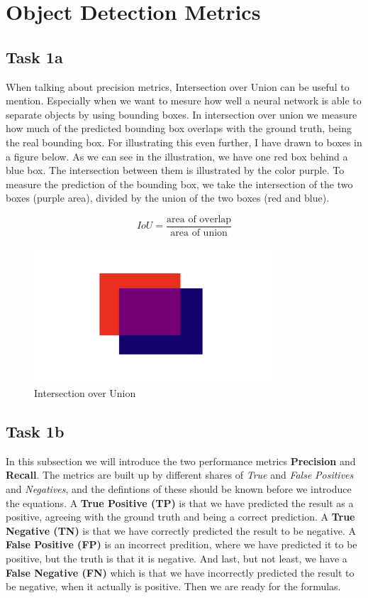 \section{Object Detection Metrics}
\subsection*{Task 1a}
When talking about precision metrics, Intersection over Union can be useful to mention.
Especially when we want to mesure how well a neural network is able to separate objects by using bounding boxes.
In intersection over union we measure how much of the predicted bounding box overlaps with the ground truth, being the real bounding box.
For illustrating this even further, I have drawn to boxes in a figure below. 
As we can see in the illustration, we have one red box behind a blue box. 
The intersection between them is illustrated by the color purple. 
To measure the prediction of the bounding box, we take the intersection of the two boxes (purple area), divided by the union of the two boxes (red and blue).

\begin{equation*}
    IoU = \frac{\text{area of overlap}}{\text{area of union}}
\end{equation*}

\begin{figure}[h!]
    \centering
    \includegraphics[width=0.8\textwidth]{Images/task1a.png}
    \caption{Intersection over Union}
\end{figure}

\subsection*{Task 1b}
In this subsection we will introduce the two performance metrics \textbf{Precision} and \textbf{Recall}.
The metrics are built up by different shares of \textit{True} and \textit{False} \textit{Positives} and \textit{Negatives}, and the defintions of these should be known before we introduce the equations.
A \textbf{True Positive (TP)} is that we have predicted the result as a positive, agreeing with the ground truth and being a correct prediction.
A \textbf{True Negative (TN)} is that we have correctly predicted the result to be negative.
A \textbf{False Positive (FP)} is an incorrect predition, where we have predicted it to be positive, but the truth is that it is negative.
And last, but not least, we have a \textbf{False Negative (FN)} which is that we have incorrectly predicted the result to be negative, when it actually is positive.
Then we are ready for the formulas.

